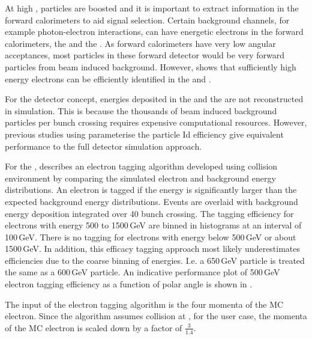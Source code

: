 At high \sqrtS, particles are boosted and it is important to extract information in the forward calorimeters to aid signal selection. Certain background channels, for example photon-electron interactions, can have energetic electrons in  the forward calorimeters, the \LumiCAL and the \BeamCAL.  As forward calorimeters have very low angular acceptances, most particles in these forward detector would be very forward particles from beam induced background. However,  \cite{sailer2012radiation} shows that sufficiently high energy electrons can be efficiently identified in the \BeamCAL and \LumiCAL.

For the \CLICILD detector concept, energies deposited in the \LumiCAL and the \BeamCAL are not reconstructed in simulation. This is because the thousands of beam induced background particles per bunch crossing requires expensive computational resources. However, previous studies \cite{Sailer:2017onh,Lukic:forwardElectron} using parameterise the particle Id efficiency  give equivalent performance to the full detector simulation approach.



For the \BeamCAL, \cite{Sailer:2017onh} describes an electron tagging algorithm developed using  collision environment by comparing the simulated electron and background energy distributions. An electron is tagged if the energy is significantly larger than the expected background energy distributions. Events are overlaid with background energy deposition integrated over 40 bunch crossing. The tagging efficiency for electrons with energy 500 to 1500\,GeV are binned in histograms at an interval of 100\,GeV. There is no tagging for electrons with energy below 500\,GeV or about 1500\,GeV. In addition, this efficacy tagging approach  most likely underestimates efficiencies due to the coarse binning of energies. I.e. a 650\,GeV particle is treated the same as a 600\,GeV particle. An indicative performance plot of 500\,GeV electron tagging efficiency as a function of polar angle is shown in .


The input of the \BeamCAL electron tagging algorithm is the four momenta of the MC electron. Since the algorithm assumes collision at , for the  user case, the momenta of the MC electron is scaled down by a factor of $\frac{3}{1.4}$.

